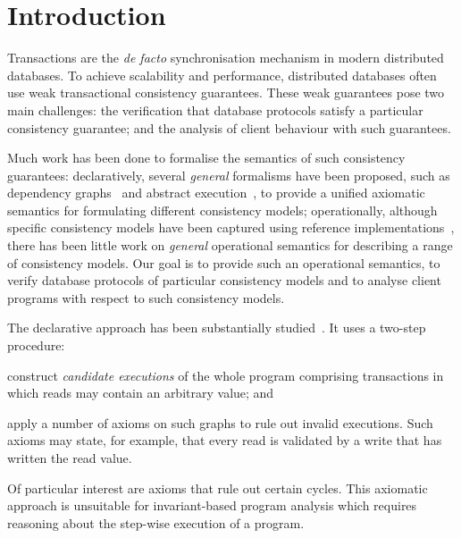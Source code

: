 \section{Introduction}
\label{sec:intro}

Transactions are the \emph{de facto} synchronisation mechanism in
modern distributed databases.  To achieve scalability and performance,
distributed databases often use weak transactional consistency
guarantees. These weak guarantees pose two main challenges: the
verification that database protocols satisfy a particular consistency
guarantee; and the analysis of client behaviour with such guarantees.

Much work has been done to formalise the semantics of such consistency
guarantees:
declaratively, several \emph{general} formalisms have been proposed, such as
dependency graphs~\cite{adya} and abstract
execution~\cite{ev_transactions}, to provide a unified axiomatic semantics for
formulating different consistency models;
operationally, although {specific} consistency models have been
captured 
using reference implementations~\cite{si,PSI,PSI-RA,cops,ramp,bayou},
there has been little work on \emph{general} operational semantics
for describing a range of consistency models.
Our goal is to provide such an  operational semantics, 
to verify database protocols of particular consistency models 
and to analyse client programs with respect to such consistency models.  

The declarative approach has been substantially
studied~\cite{adya,ev_transactions,framework-concur,laws}. 
It uses  a two-step procedure:
\begin{enumerate*}
\item construct {\em candidate executions} of the whole program comprising
transactions in which reads may contain an arbitrary value; and 
\item apply a number of axioms on such graphs to rule out invalid executions. 
Such axioms may state, for example, that every read is
validated by a write that has written the read value. 
\end{enumerate*}
Of particular interest are axioms that rule out certain cycles.
This axiomatic approach is unsuitable for invariant-based program analysis 
which requires reasoning about the step-wise execution of a program. 

